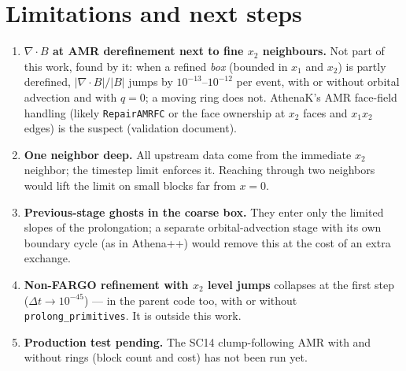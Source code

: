 \documentclass[11pt]{article}
\newcommand{\code}[1]{\texttt{#1}}
\newcommand{\fn}[1]{\texttt{\small #1}}
\begin{document}
\section{Limitations and next steps}
\label{sec:limits}
\begin{enumerate}\itemsep4pt
\item \textbf{$\nabla\!\cdot\!B$ at AMR derefinement next to fine $x_2$ neighbours.}
      Not part of this work, found by it: when a refined \emph{box} (bounded in $x_1$ and
      $x_2$) is partly derefined, $|\nabla\!\cdot\!B|/|B|$ jumps by $10^{-13}$--$10^{-12}$
      per event, with or without orbital advection and with $q = 0$; a moving ring does
      not. AthenaK's AMR face-field handling (likely \fn{RepairAMRFC} or the face
      ownership at $x_2$ faces and $x_1x_2$ edges) is the suspect (validation document).
\item \textbf{One neighbor deep.} All upstream data come from the immediate $x_2$
      neighbor; the timestep limit enforces it. Reaching through two neighbors would lift
      the limit on small blocks far from $x = 0$.
\item \textbf{Previous-stage ghosts in the coarse box.} They enter only the limited
      slopes of the prolongation; a separate orbital-advection stage with its own
      boundary cycle (as in Athena++) would remove this at the cost of an extra exchange.
\item \textbf{Non-FARGO refinement with $x_2$ level jumps} collapses at the first step
      ($\Delta t \to 10^{-45}$) --- in the parent code too, with or without
      \code{prolong\_primitives}. It is outside this work.
\item \textbf{Production test pending.} The SC14 clump-following AMR with and without
      rings (block count and cost) has not been run yet.
\end{enumerate}
\end{document}
